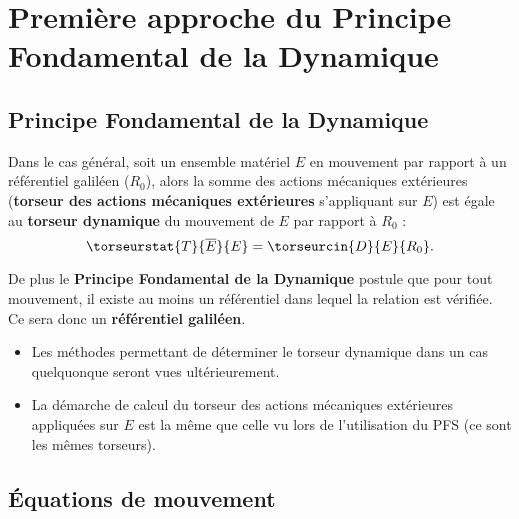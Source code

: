 \section[PFD : cas général]{Première approche du Principe Fondamental de la Dynamique}

\subsection{Principe Fondamental de la Dynamique}



\begin{defi}
Dans le cas général, soit un ensemble matériel $E$ en mouvement par rapport à un référentiel galiléen ($R_0$), alors la somme des actions mécaniques extérieures (\textbf{torseur des actions mécaniques extérieures} s'appliquant sur $E$) est égale au \textbf{torseur dynamique} du mouvement de $E$ par rapport à $R_0$ :
$$
\torseurstat{T}{\overline{E}}{E}=\torseurcin{D}{E}{R_0}.
$$

De plus le \textbf{Principe Fondamental de la Dynamique} postule que pour tout mouvement, il existe au moins un référentiel dans lequel la relation est vérifiée. Ce sera donc un \textbf{référentiel galiléen}.

\end{defi}

\begin{remarque}[s]
\begin{itemize}
\item Les méthodes permettant de déterminer le torseur dynamique dans un cas quelquonque seront vues ultérieurement.
\item La démarche de calcul du torseur des actions mécaniques extérieures appliquées sur $E$ est la même que celle vu lors de l'utilisation du PFS (ce sont les mêmes torseurs). 
\end{itemize}
\end{remarque}

\subsection{Équations de mouvement}

